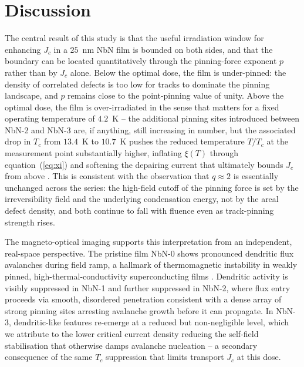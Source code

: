 \section{Discussion}
\label{sec:discussion}

The central result of this study is that the useful irradiation window for enhancing $J_c$ in a $25$~nm NbN film is bounded on both sides, and that the boundary can be located quantitatively through the pinning-force exponent $p$ rather than by $J_c$ alone. Below the optimal dose, the film is under-pinned: the density of correlated defects is too low for tracks to dominate the pinning landscape, and $p$ remains close to the point-pinning value of unity. Above the optimal dose, the film is over-irradiated in the sense that matters for a fixed operating temperature of $4.2$~K -- the additional pinning sites introduced between NbN-2 and NbN-3 are, if anything, still increasing in number, but the associated drop in $T_c$ from $13.4$~K to $10.7$~K pushes the reduced temperature $T/T_c$ at the measurement point substantially higher, inflating $\xi(T)$ through equation~(\ref{eq:xi}) and softening the depairing current that ultimately bounds $J_c$ from above \cite{tinkham2004}. This is consistent with the observation that $q\approx2$ is essentially unchanged across the series: the high-field cutoff of the pinning force is set by the irreversibility field and the underlying condensation energy, not by the areal defect density, and both continue to fall with fluence even as track-pinning strength rises.

The magneto-optical imaging supports this interpretation from an independent, real-space perspective. The pristine film NbN-0 shows pronounced dendritic flux avalanches during field ramp, a hallmark of thermomagnetic instability in weakly pinned, high-thermal-conductivity superconducting films \cite{vestgarden2011}. Dendritic activity is visibly suppressed in NbN-1 and further suppressed in NbN-2, where flux entry proceeds via smooth, disordered penetration consistent with a dense array of strong pinning sites arresting avalanche growth before it can propagate. In NbN-3, dendritic-like features re-emerge at a reduced but non-negligible level, which we attribute to the lower critical current density reducing the self-field stabilisation that otherwise damps avalanche nucleation -- a secondary consequence of the same $T_c$ suppression that limits transport $J_c$ at this dose.

